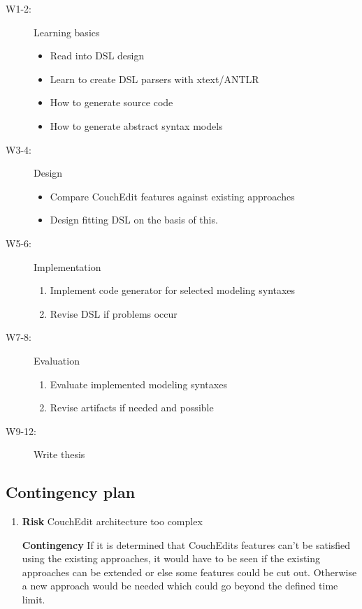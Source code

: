 \documentclass[10pt,a4paper,oneside]{scrartcl}
\newcommand\hint[2]{
\ifthenelse{\boolean{showhints}}{
\begin{center}
\colorbox{black!10}{
\begin{minipage}{.963\textwidth}
#2\hfill\textbf{#1}
\end{minipage}
}\end{center}}{}
}
\begin{document}
\begin{description}
  \item[W1-2:] Learning basics
        \begin{itemize}
          \item Read into DSL design
          \item Learn to create DSL parsers with xtext/ANTLR
          \item How to generate source code
          \item How to generate abstract syntax models
        \end{itemize}
  \item[W3-4:] Design
        \begin{itemize}
          \item Compare CouchEdit features against existing approaches
          \item Design fitting DSL on the basis of this.
        \end{itemize}
  \item[W5-6:] Implementation
        \begin{enumerate}
          \item Implement code generator for selected modeling syntaxes
          \item Revise DSL if problems occur
        \end{enumerate}
  \item[W7-8:] Evaluation
        \begin{enumerate}
          \item Evaluate implemented modeling syntaxes
          \item Revise artifacts if needed and possible
        \end{enumerate}
  \item[W9-12:] Write thesis
\end{description}

\subsection{Contingency plan}
\label{sub:contingency}


\begin{enumerate}
  \item \textbf{Risk} CouchEdit architecture too complex

        \textbf{Contingency} If it is determined that CouchEdits features can't be satisfied using the existing approaches, it would have to be seen if the existing approaches can be extended or else some features could be cut out. Otherwise a new approach would be needed which could go beyond the defined time limit.
\end{enumerate}

\nocite{*}
\printbibliography
\end{document}
